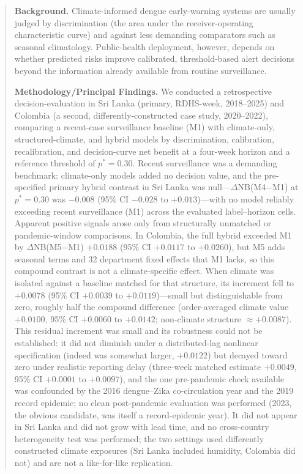 \documentclass[11pt,a4paper]{article}
\begin{document}
\begin{abstract}
\noindent\textbf{Background.}
Climate-informed dengue early-warning systems are usually judged by discrimination (the area under the receiver-operating characteristic curve) and against less demanding comparators such as seasonal climatology. Public-health deployment, however, depends on whether predicted risks improve calibrated, threshold-based alert decisions beyond the information already available from routine surveillance.

\noindent\textbf{Methodology/Principal Findings.}
We conducted a retrospective decision-evaluation in Sri Lanka (primary, RDHS-week, 2018--2025) and Colombia (a second, differently-constructed case study, 2020--2022), comparing a recent-case surveillance baseline (M1) with climate-only, structured-climate, and hybrid models by discrimination, calibration, recalibration, and decision-curve net benefit at a four-week horizon and a reference threshold of $p^*=0.30$. Recent surveillance was a demanding benchmark: climate-only models added no decision value, and the pre-specified primary hybrid contrast in Sri Lanka was null---$\Delta$NB(M4$-$M1) at $p^*=0.30$ was $-0.008$ (95\% CI $-0.028$ to $+0.013$)---with no model reliably exceeding recent surveillance (M1) across the evaluated label--horizon cells. Apparent positive signals arose only from structurally unmatched or pandemic-window comparisons. In Colombia, the full hybrid exceeded M1 by $\Delta$NB(M5$-$M1) $+0.0188$ (95\% CI $+0.0117$ to $+0.0260$), but M5 adds seasonal terms and 32 department fixed effects that M1 lacks, so this compound contrast is not a climate-specific effect. When climate was isolated against a baseline matched for that structure, its increment fell to $+0.0078$ (95\% CI $+0.0039$ to $+0.0119$)---small but distinguishable from zero, roughly half the compound difference (order-averaged climate value $+0.0100$, 95\% CI $+0.0060$ to $+0.0142$; non-climate structure $\approx+0.0087$). This residual increment was small and its robustness could not be established: it did not diminish under a distributed-lag nonlinear specification (indeed was somewhat larger, $+0.0122$) but decayed toward zero under realistic reporting delay (three-week matched estimate $+0.0049$, 95\% CI $+0.0001$ to $+0.0097$), and the one pre-pandemic check available was confounded by the 2016 dengue--Zika co-circulation year and the 2019 record epidemic; no clean post-pandemic evaluation was performed (2023, the obvious candidate, was itself a record-epidemic year). It did not appear in Sri Lanka and did not grow with lead time, and no cross-country heterogeneity test was performed; the two settings used differently constructed climate exposures (Sri Lanka included humidity, Colombia did not) and are not a like-for-like replication.


\end{abstract}
\end{document}
